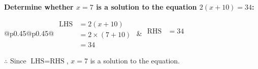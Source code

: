 \documentclass[12pt, varwidth, border=5mm]{standalone}
\begin{document}
    \noindent \textbf{Determine whether \(x = 7\) is a solution to the equation \(2(x + 10) = 34\):}
\vspace{4pt}  %

\noindent
\renewcommand{\arraystretch}{1.3} %
\begin{tabular}{@{}p{0.45\linewidth}@{}p{0.45\linewidth}@{}}
    \(\begin{aligned}
        \text{LHS} &= 2(x + 10) \\
                   &= 2 \times(7 + 10) \\
                   &= 34
    \end{aligned}\) &
    \(\begin{aligned}
        \text{RHS} &= 34\\
                   & \\
                   &
    \end{aligned}\)
\end{tabular}
\renewcommand{\arraystretch}{1.0} %
\vspace{2pt}  %

\noindent \(\therefore\) Since \(\text{LHS} = \text{RHS}\), \(x = 7\) is  a solution to the equation.
\end{document}
